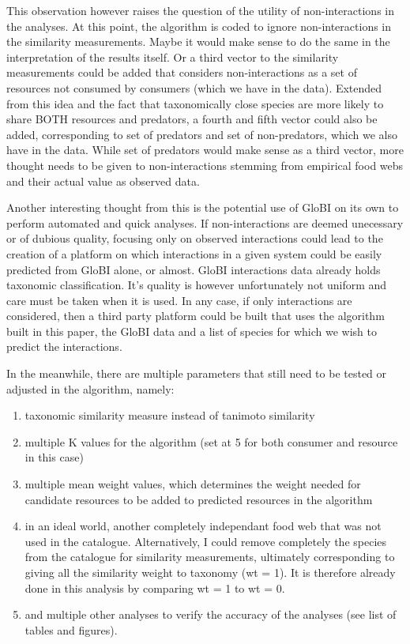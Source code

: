 \documentclass[letterpaper]{article}
\begin{document}
This observation however raises the question of the utility of non-interactions in the analyses. At this point, the algorithm is coded to ignore non-interactions in the similarity measurements. Maybe it would make sense to do the same in the interpretation of the results itself. Or a third vector to the similarity measurements could be added that considers non-interactions as a set of resources not consumed by consumers (which we have in the data). Extended from this idea and the fact that taxonomically close species are more likely to share BOTH resources and predators, a fourth and fifth vector could also be added, corresponding to set of predators and set of non-predators, which we also have in the data. While set of predators would make sense as a third vector, more thought needs to be given to non-interactions stemming from empirical food webs and their actual value as observed data.

Another interesting thought from this is the potential use of GloBI on its own to perform automated and quick analyses. If non-interactions are deemed unecessary or of dubious quality, focusing only on observed interactions could lead to the creation of a platform on which interactions in a given system could be easily predicted from GloBI alone, or almost. GloBI interactions data already holds taxonomic classification. It's quality is however unfortunately not uniform and care must be taken when it is used. In any case, if only interactions are considered, then a third party platform could be built that uses the algorithm built in this paper, the GloBI data and a list of species for which we wish to predict the interactions.

In the meanwhile, there are multiple parameters that still need to be tested or adjusted in the algorithm, namely:
\begin{enumerate}
    \item taxonomic similarity measure instead of tanimoto similarity
    \item multiple K values for the algorithm (set at 5 for both consumer and resource in this case)
    \item multiple mean weight values, which determines the weight needed for candidate resources to be added to predicted resources in the algorithm
    \item in an ideal world, another completely independant food web that was not used in the catalogue. Alternatively, I could remove completely the species from the catalogue for similarity measurements, ultimately corresponding to giving all the similarity weight to taxonomy (wt = 1). It is therefore already done in this analysis by comparing wt = 1 to wt = 0.
    \item and multiple other analyses to verify the accuracy of the analyses (see list of tables and figures).
\end{enumerate}
\end{document}
